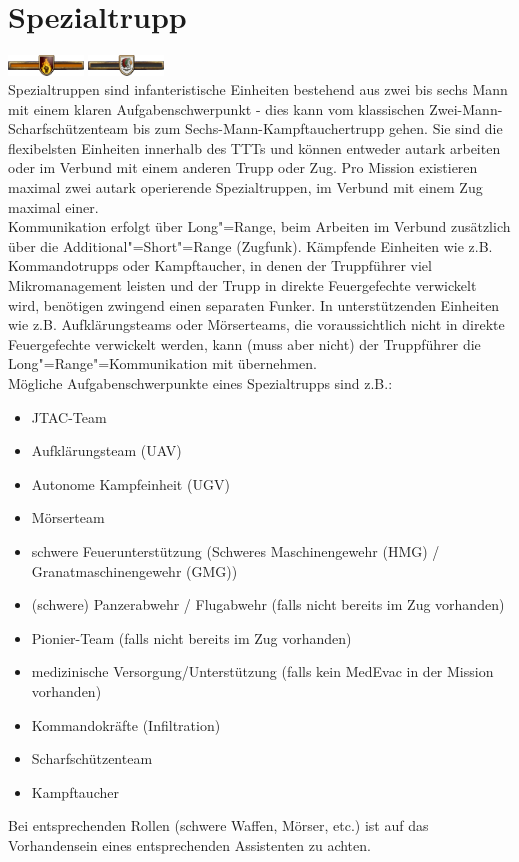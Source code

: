 \section{Spezialtrupp}
\includegraphics[width=20mm]{./img/truppenordnung/spezialeinheiten/sf1}\quad
\includegraphics[width=20mm]{./img/truppenordnung/spezialeinheiten/sf2}\\
Spezialtruppen sind infanteristische Einheiten bestehend aus zwei bis sechs Mann mit einem klaren Aufgabenschwerpunkt - dies kann vom klassischen Zwei-Mann-Scharfschützenteam bis zum Sechs-Mann-Kampftauchertrupp gehen. Sie sind die flexibelsten Einheiten innerhalb des TTTs und können entweder autark arbeiten oder im Verbund mit einem anderen Trupp oder Zug. Pro Mission existieren maximal zwei autark operierende Spezialtruppen, im Verbund mit einem Zug maximal einer.\\
Kommunikation erfolgt über Long"=Range, beim Arbeiten im Verbund zusätzlich über die Additional"=Short"=Range (Zugfunk). Kämpfende Einheiten wie z.B. Kommandotrupps oder Kampftaucher, in denen der Truppführer viel Mikromanagement leisten und der Trupp in direkte Feuergefechte verwickelt wird, benötigen zwingend einen separaten Funker. In unterstützenden Einheiten wie z.B. Aufklärungsteams oder Mörserteams, die voraussichtlich nicht in direkte Feuergefechte verwickelt werden, kann (muss aber nicht) der Truppführer die Long"=Range"=Kommunikation mit übernehmen.\\
Mögliche Aufgabenschwerpunkte eines Spezialtrupps sind z.B.:

\begin{itemize}
	\setlength\itemsep{0.2em}
	\item JTAC-Team
	\item Aufklärungsteam (UAV)
	\item Autonome Kampfeinheit (UGV)
	\item Mörserteam
	\item schwere Feuerunterstützung (Schweres Maschinengewehr (HMG) / Granatmaschinengewehr (GMG))
	\item (schwere) Panzerabwehr / Flugabwehr (falls nicht bereits im Zug vorhanden)
	\item Pionier-Team (falls nicht bereits im Zug vorhanden)
	\item medizinische Versorgung/Unterstützung (falls kein MedEvac in der Mission vorhanden)
	\item Kommandokräfte (Infiltration)
	\item Scharfschützenteam
	\item Kampftaucher
\end{itemize}
Bei entsprechenden Rollen (schwere Waffen, Mörser, etc.) ist auf das Vorhandensein eines entsprechenden Assistenten zu achten.